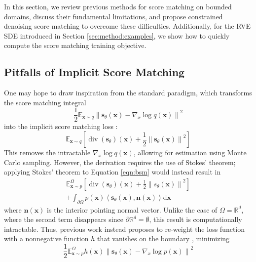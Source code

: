 \documentclass{article}
\theoremstyle{plain}
\theoremstyle{definition}
\theoremstyle{remark}
\DeclareMathOperator{\ddiv}{div}
\newcommand{\R}{\mathbb{R}}
\newcommand{\E}{\mathbb{E}}
\newcommand{\sqbrac}[1]{\left[#1\right]}
\newcommand{\norm}[1]{\left\|#1\right\|}
\newcommand{\grad}{\nabla}
\newcommand{\inn}[1]{\left\langle#1\right\rangle}
\renewcommand{\vec}{\mathbf}
\newcommand{\dd}{\mathrm{d}}
\begin{document}
In this section, we review previous methods for score matching on bounded domains, discuss their fundamental limitations, and propose constrained denoising score matching to overcome these difficulties. Additionally, for the RVE SDE introduced in Section \ref{sec:method:examples}, we show how to quickly compute the score matching training objective.

\subsection{Pitfalls of Implicit Score Matching}

One may hope to draw inspiration from the standard paradigm, which transforms the score matching integral
\begin{equation}\label{eqn:sm}
    \frac{1}{2}\E_{\vec{x} \sim q} \norm{\vec{s}_\theta(\vec{x}) - \grad_x \log q(\vec{x})}^2
\end{equation}
into the implicit score matching loss \citep{Hyvrinen2005EstimationON}:
\begin{equation}
    \E_{\vec{x} \sim q} \sqbrac{\ddiv(\vec{s}_\theta)(\vec{x}) + \frac{1}{2}\norm{\vec{s}_\theta(\vec{x})}^2}
\end{equation}
This removes the intractable $\grad_x \log q(\vec{x})$, allowing for estimation using Monte Carlo sampling. However, the derivation requires the use of Stokes' theorem; applying Stokes' theorem to Equation \ref{eqn:bsm} would instead result in
\begin{equation}
    \begin{gathered}
        \E_{\vec{x} \sim p}^{\Omega} \sqbrac{\ddiv(\vec{s}_\theta)(\vec{x}) + \frac{1}{2}\norm{s_\theta(\vec{x})}^2}\\
        + \int_{\partial \Omega} p(\vec{x})\inn{\vec{s}_\theta(\vec{x}), \vec{n}(\vec{x})} \dd \vec{x}
    \end{gathered}
\end{equation}
where $\vec{n}(\vec{x})$ is the interior pointing normal vector. Unlike the case of $\Omega = \R^d$, where the second term disappears since $\partial \R^d = \emptyset$, this result is computationally intractable. Thus, previous work instead proposes to re-weight the loss function with a nonnegative function $h$ that vanishes on the boundary \citep{Hyvrinen2007SomeEO, Yu2020GeneralizedSM}, minimizing
\begin{equation}\label{eqn:bsmreg}
    \frac{1}{2}\E_{\vec{x} \sim p}^{\Omega} h(\vec{x})\norm{\vec{s}_\theta(\vec{x}) - \grad_x \log p(\vec{x})}^2
\end{equation}
\end{document}
